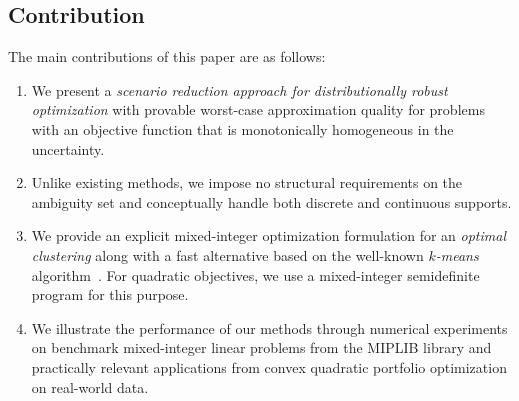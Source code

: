 \documentclass{article}
\begin{document}
\subsection{Contribution}

The main contributions of this paper are as follows:
\begin{enumerate}
	\item We present a \emph{scenario reduction approach for distributionally robust optimization} with provable worst-case approximation quality for problems with an objective function that is monotonically homogeneous in the uncertainty.%
	\item Unlike existing methods, we impose no structural requirements on the ambiguity set and conceptually handle both discrete and continuous supports.
	\item We provide an explicit mixed-integer optimization formulation for an \emph{optimal clustering} along with a fast alternative based on the well-known \emph{$k$-means}
          algorithm~\cite{kmeans_macqueen}. For quadratic objectives, we use a mixed-integer semidefinite program for this purpose. %
	\item We illustrate the performance of our methods through numerical experiments on benchmark mixed-integer linear problems from the MIPLIB library and practically relevant applications from convex quadratic portfolio optimization on real-world data.
\end{enumerate}

\end{document}

